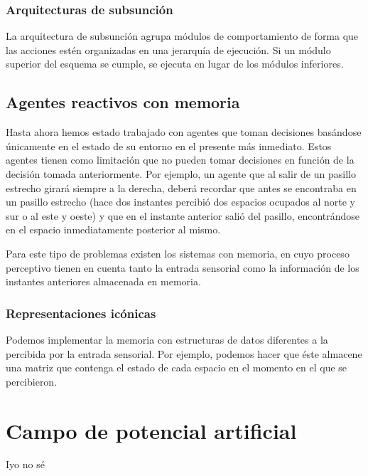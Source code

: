 \subsubsection{Arquitecturas de subsunción}

La arquitectura de subsunción agrupa módulos de comportamiento de forma que las acciones estén organizadas en una jerarquía de ejecución.
Si un módulo superior del esquema se cumple, se ejecuta en lugar de los módulos inferiores.

\subsection{Agentes reactivos con memoria}

Hasta ahora hemos estado trabajado con agentes que toman decisiones basándose únicamente en el estado de su entorno en el presente más inmediato.
Estos agentes tienen como limitación que no pueden tomar decisiones en función de la decisión tomada anteriormente.
Por ejemplo, un agente que al salir de un pasillo estrecho girará siempre a la derecha, deberá recordar que antes se encontraba en un pasillo estrecho (hace dos instantes percibió dos espacios ocupados al norte y sur o al este y oeste) y que en el instante anterior salió del pasillo, encontrándose en el espacio inmediatamente posterior al mismo.

Para este tipo de problemas existen los sistemas con memoria, en cuyo proceso perceptivo tienen en cuenta tanto la entrada sensorial como la información de los instantes anteriores almacenada en memoria.

\subsubsection{Representaciones icónicas}

Podemos implementar la memoria con estructuras de datos diferentes a la percibida por la entrada sensorial.
Por ejemplo, podemos hacer que éste almacene una matriz que contenga el estado de cada espacio en el momento en el que se percibieron.

\section{Campo de potencial artificial}

Iyo no sé
